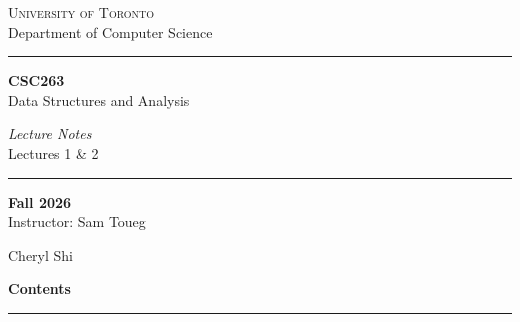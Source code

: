 \documentclass[11pt]{article}
\begin{document}
\begin{titlepage}
\thispagestyle{empty}
\centering
\vspace*{1.2cm}
{\small\textcolor{greyline}{\scshape University of Toronto}}\\[4pt]
{\small\textcolor{greyline}{Department of Computer Science}}

\vspace{1.0cm}
\textcolor{violetT}{\rule{0.72\linewidth}{1.4pt}}

\vspace{0.7cm}
{\fontsize{62}{62}\selectfont\bfseries\textcolor{utnavy}{CSC263}}\\[10pt]
{\LARGE\textcolor{utnavy}{Data Structures and Analysis}}

\vspace{0.5cm}
{\large\itshape\textcolor{greyline}{Lecture Notes}}\\[4pt]
{\large\textcolor{violetT}{Lectures 1 \& 2}}

\vspace{0.5cm}
\textcolor{violetT}{\rule{0.72\linewidth}{1.4pt}}

\vspace{0.7cm}
{\large\textbf{Fall 2026}}\\[6pt]
{\normalsize\textcolor{greyline}{Instructor: Sam Toueg}}

\vspace{0.5cm}
{\Large\textcolor{utnavy}{Cheryl Shi}}

\vfill
{\centering\large\textcolor{violetT}{\bfseries Contents}\par}
\vspace{4pt}
\textcolor{greyline}{\rule{0.72\linewidth}{0.5pt}}
\vspace{6pt}

\begin{minipage}{0.86\linewidth}\small
\makeatletter{}\makeatother
\end{minipage}
\vspace{0.8cm}
\end{titlepage}
\setcounter{page}{1}

\pagestyle{fancy}
\fancyhf{}
\renewcommand{\headrulewidth}{0.4pt}
\fancyhead[L]{\small\textcolor{violetT}{CSC263 \;$\vert$\; Data Structures and Analysis}}
\fancyhead[R]{\small\textcolor{greyline}{Cheryl Shi}}
\fancyfoot[C]{\small\textcolor{greyline}{\thepage}}

\end{document}
